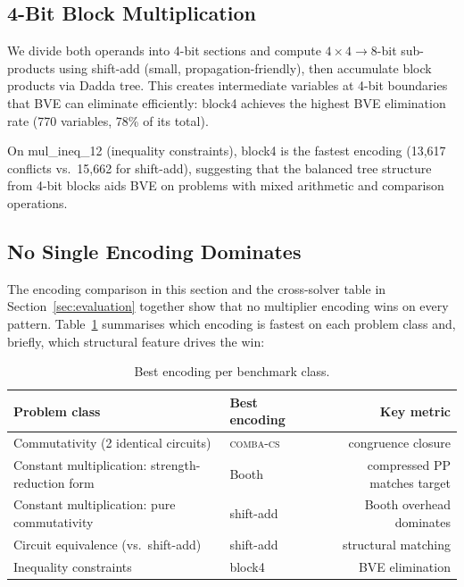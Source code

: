 \documentclass[a4paper]{ceurart}
\newcommand{\combacs}{\textsc{comba-cs}\xspace}
\begin{document}
\subsection{4-Bit Block Multiplication}

We divide both operands into 4-bit sections and compute $4 \times 4
\to 8$-bit sub-products using shift-add (small, propagation-friendly),
then accumulate block products via Dadda tree. This creates
intermediate variables at 4-bit boundaries that BVE can eliminate
efficiently: block4 achieves the highest BVE elimination rate (770
variables, 78\% of its total).

On mul\_ineq\_12 (inequality constraints), block4 is the fastest
encoding (13,617 conflicts vs.\ 15,662 for shift-add), suggesting
that the balanced tree structure from 4-bit blocks aids BVE on
problems with mixed arithmetic and comparison operations.

\subsection{No Single Encoding Dominates}

The encoding comparison in this section and the cross-solver table
in Section~\ref{sec:evaluation} together show that no multiplier
encoding wins on every pattern. Table~\ref{tab:best} summarises
which encoding is fastest on each problem class and, briefly,
which structural feature drives the win:

\begin{table}[ht]
\caption{Best encoding per benchmark class.}
\label{tab:best}
\centering
\begin{tabular}{llr}
\toprule
Problem class & Best encoding & Key metric \\
\midrule
Commutativity (2 identical circuits) & \combacs & congruence closure \\
Constant multiplication: strength-reduction form & Booth & compressed PP matches target \\
Constant multiplication: pure commutativity & shift-add & Booth overhead dominates \\
Circuit equivalence (vs.\ shift-add) & shift-add & structural matching \\
Inequality constraints & block4 & BVE elimination \\
\bottomrule
\end{tabular}
\end{table}
\end{document}
